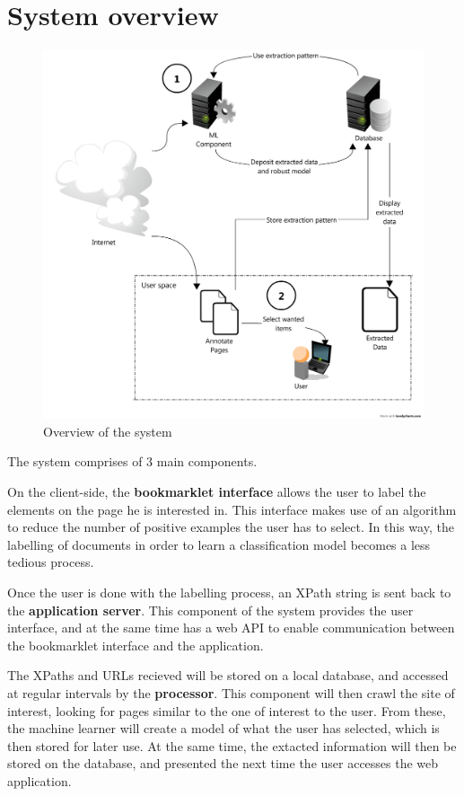 \section{System overview}
\begin{figure}[htbp]
\centering
\includegraphics[scale=0.5]{parcels.png} 
\caption{Overview of the system}
\label{fig:architecture}
\end{figure}
The system comprises of 3 main components.

On the client-side, the \textbf{bookmarklet interface} allows the user to label the elements on the page he is interested in. This interface makes use of an algorithm to reduce the number of positive examples the user has to select. In this way, the labelling of documents in order to learn a classification model becomes a less tedious process.

Once the user is done with the labelling process, an XPath string is sent back to the \textbf{application server}. This component of the system provides the user interface, and at the same time has a web API to enable communication between the bookmarklet interface and the application.

The XPaths and URLs recieved will be stored on a local database, and accessed at regular intervals by the \textbf{processor}. This component will then crawl the site of interest, looking for pages similar to the one of interest to the user. From these, the machine learner will create a model of what the user has selected, which is then stored for later use. At the same time, the extacted information will then be stored on the database, and presented the next time the user accesses the web application.

